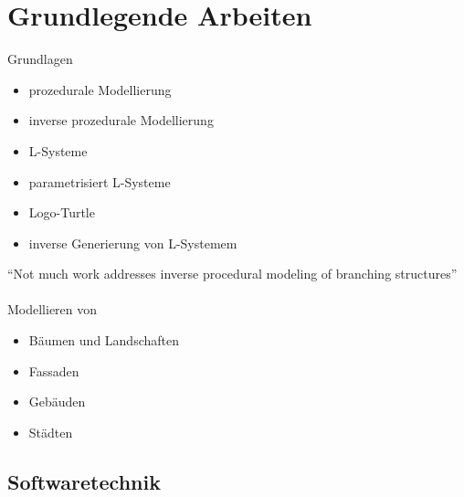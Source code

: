 \section{Grundlegende Arbeiten}

Grundlagen
\begin{itemize}
    \item prozedurale Modellierung~\cite{smelik_2014}
    \item inverse prozedurale Modellierung~\cite{aliaga_2016}
    \item L-Systeme~\cite{lindemayer_1968}
    \item parametrisiert L-Systeme~\cite{prusinkiewicz_1993}
    \item Logo-Turtle~\cite{prusinkiewicz_1986}
    \item inverse Generierung von L-Systemem~\cite{higuera_2010}
\end{itemize}

"`Not much work addresses inverse procedural modeling of branching structures"'\\~\\

Modellieren von
\begin{itemize}
    \item Bäumen und Landschaften~\cite{deussen_2010}
    \item Fassaden~\cite{alhalawani_2013}
    \item Gebäuden~\cite{mueller_2006}
    \item Städten~\cite{parish_2001}
\end{itemize}

\subsection{Softwaretechnik}

